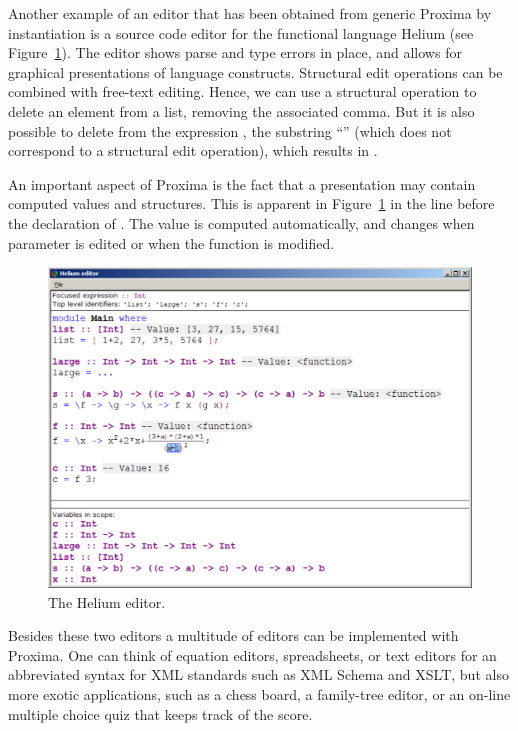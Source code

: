 \documentclass[10pt]{article}
\begin{document}
Another example of an editor that has been obtained from generic Proxima by instantiation is a source code editor for the functional language Helium (see Figure~\ref{fig:heliumEditor}). The editor shows parse and type errors in place, and allows for graphical presentations of language constructs. Structural edit operations can be combined with free-text editing. Hence, we can use a structural operation to delete an element from a list, removing the associated comma. But it is also possible to delete from the expression \p{[ 1+2, 3]},  the substring ``'' (which does not correspond to a structural edit operation), which results in \p{[ 13 ]}. 


An important aspect of Proxima is the fact that a presentation may contain computed values and structures. This is apparent in Figure~\ref{fig:heliumEditor} in the line before the declaration of . The value  is computed automatically, and changes when parameter  is edited or when the function  is modified.

\begin{figure}
\includegraphics[width=12cm]{images/heliumMainWindow}
\caption{The Helium editor.}
\label{fig:heliumEditor}
\end{figure}

Besides these two editors a multitude of editors can be implemented with Proxima. One can think of equation editors, spreadsheets, or text editors for an abbreviated syntax for XML standards such as XML Schema and XSLT, but also more exotic applications, such as a chess board, a family-tree editor, or an on-line multiple choice quiz that keeps track of the score.
\end{document}
